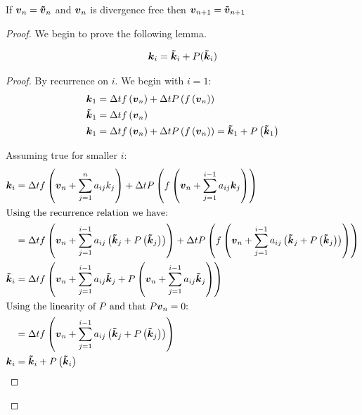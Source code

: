 \begin{theorem}
If ${\boldsymbol {v}}_{n}={\boldsymbol {\tilde{v}}}_{n}$ and ${\boldsymbol {v}}_n$ is divergence free then ${\boldsymbol {v}}_{n+1}={\boldsymbol {\tilde{v}}}_{n+1}$ 
\end{theorem}
\begin{proof}
We begin to prove the following lemma.
\begin{lemma}
\begin{equation}
  {\boldsymbol {k}}_{i}={\boldsymbol {\tilde{k}}}_{i}+P({\boldsymbol {\tilde{k}}}_{i})
\end{equation}
\end{lemma}
\begin{proof}
By recurrence on $i$.
We begin with $i=1$:
\begin{align}
  {\boldsymbol {k}}_{1}&=\Delta tf\left({\boldsymbol {v}}_n\right)+\Delta tP\left(f\left({\boldsymbol {v}}_n\right)\right)\\
{\boldsymbol {\tilde{k}}}_{1}&=\Delta tf\left({\boldsymbol {v}}_n\right)\\
  {\boldsymbol {k}}_{1}&=\Delta t f\left({\boldsymbol {v}}_n\right)+\Delta tP\left(f\left({\boldsymbol {v}}_n\right)\right)={\boldsymbol {\tilde{k}}}_1+P\left({\boldsymbol {\tilde{k}}}_1\right)
\end{align}

Assuming true for smaller $i$:
\begin{align*}
  {\boldsymbol {k}}_{i}&=\Delta tf\left({\boldsymbol {v}}_n+\sum_{j=1}^{n}a_{ij}k_{j}\right)+\Delta tP\left(f\left({\boldsymbol {v}}_n+\sum_{j=1}^{i-1}a_{ij}{\boldsymbol {k}}_{j}\right)\right)\\
  \intertext{Using the recurrence relation we have:}
  &=\Delta tf\left({\boldsymbol {v}}_n+\sum_{j=1}^{i-1}a_{ij}\left({\boldsymbol {\tilde{k}}}_{j}+P\left({\boldsymbol {\tilde{k}}}_{j}\right)\right)\right)+\Delta tP\left(f\left({\boldsymbol {v}}_n+\sum_{j=1}^{i-1}a_{ij}\left({\boldsymbol {\tilde{k}}}_{j}+P\left({\boldsymbol {\tilde{k}}}_{j}\right)\right)\right)\right)\\
  {\boldsymbol {\tilde{k}}}_{i}&=\Delta tf\left({\boldsymbol {v}}_n+\sum_{j=1}^{i-1}a_{ij}{\boldsymbol {\tilde{k}}}_{j}+P\left({\boldsymbol {v}}_n+\sum_{j=1}^{i-1}a_{ij}{\boldsymbol {\tilde{k}}}_{j}\right)\right)\\
  \intertext{Using the linearity of $P$ and that $P{\boldsymbol {v}}_{n}=0$:}
  &=\Delta tf\left({\boldsymbol {v}}_n+\sum_{j=1}^{i-1}a_{ij}\left({\boldsymbol {\tilde{k}}}_{j}+P\left({\boldsymbol {\tilde{k}}}_{j}\right)\right)\right)\\
  {\boldsymbol {k}}_{i}&={\boldsymbol {\tilde{k}}}_{i}+P\left({\boldsymbol {\tilde{k}}}_{i}\right)
\end{align*}
\end{proof}


\end{proof}
